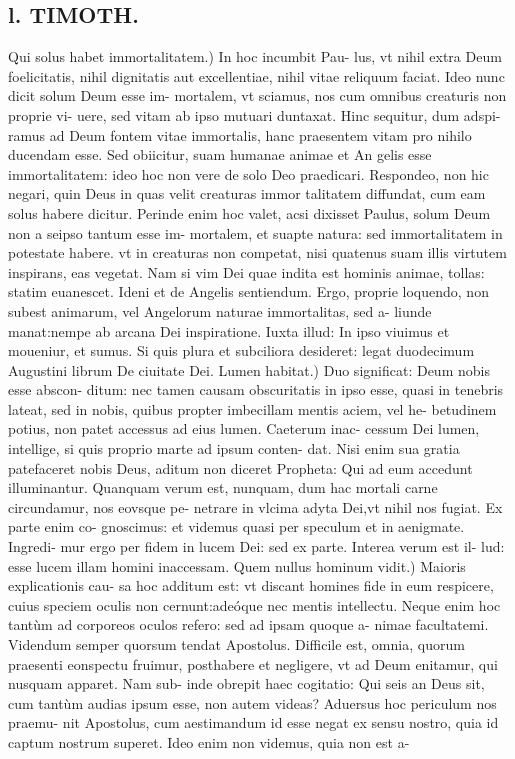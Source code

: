\documentclass{article}
\begin{document}
\begin{pages}
\section*{l. TIMOTH. }
\marginpar{[ p.82 ]}\pstart Qui solus habet immortalitatem.) In hoc incumbit Pau- lus, vt nihil extra Deum foelicitatis, nihil dignitatis aut excellentiae, nihil vitae reliquum faciat. Ideo nunc dicit solum Deum esse im- mortalem, vt sciamus, nos cum omnibus creaturis non proprie vi- uere, sed vitam ab ipso mutuari duntaxat. Hinc sequitur, dum adspi- ramus ad Deum fontem vitae immortalis, hanc praesentem vitam pro nihilo ducendam esse. Sed obiicitur, suam humanae animae et An gelis esse immortalitatem: ideo hoc non vere de solo Deo praedicari. Respondeo, non hic negari, quin Deus in quas velit creaturas immor talitatem diffundat, cum eam solus habere dicitur. Perinde enim hoc valet, acsi dixisset Paulus, solum Deum non a seipso tantum esse im- mortalem, et suapte natura: sed immortalitatem in potestate habere. vt in creaturas non competat, nisi quatenus suam illis virtutem inspirans, eas vegetat. Nam si vim Dei quae indita est hominis animae, tollas: statim euanescet. Ideni et de Angelis sentiendum. Ergo, proprie loquendo, non subest animarum, vel Angelorum naturae immortalitas, sed a- liunde manat:nempe ab arcana Dei inspiratione. Iuxta illud: In ipso viuimus et moueniur, et sumus. Si quis plura et subciliora desideret: legat duodecimum Augustini librum De ciuitate Dei.  \pend\pstart Lumen habitat.) Duo significat: Deum nobis esse abscon- ditum: nec tamen causam obscuritatis in ipso esse, quasi in tenebris lateat, sed in nobis, quibus propter imbecillam mentis aciem, vel he- betudinem potius, non patet accessus ad eius lumen. Caeterum inac- cessum Dei lumen, intellige, si quis proprio marte ad ipsum conten- dat. Nisi enim sua gratia patefaceret nobis Deus, aditum non diceret Propheta: Qui ad eum accedunt illuminantur. Quanquam verum est, nunquam, dum hac mortali carne circundamur, nos eovsque pe- netrare in vlcima adyta Dei,vt nihil nos fugiat. Ex parte enim co- gnoscimus: et videmus quasi per speculum et in aenigmate. Ingredi- mur ergo per fidem in lucem Dei: sed ex parte. Interea verum est il- lud: esse lucem illam homini inaccessam.  \pend\pstart Quem nullus hominum vidit.) Maioris explicationis cau- sa hoc additum est: vt discant homines fide in eum respicere, cuius speciem oculis non cernunt:adeóque nec mentis intellectu. Neque enim hoc tantùm ad corporeos oculos refero: sed ad ipsam quoque a- nimae facultatemi. Videndum semper quorsum tendat Apostolus. Difficile est, omnia, quorum praesenti eonspectu fruimur, posthabere et negligere, vt ad Deum enitamur, qui nusquam apparet. Nam sub- inde obrepit haec cogitatio: Qui seis an Deus sit, cum tantùm audias ipsum esse, non autem videas? Aduersus hoc periculum nos praemu- nit Apostolus, cum aestimandum id esse negat ex sensu nostro, quia id captum nostrum superet. Ideo enim non videmus, quia non est a-  \pend

\end{pages}
\end{document}
